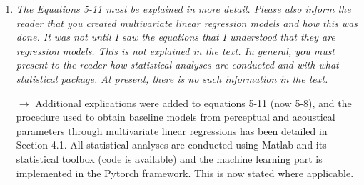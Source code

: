 \documentclass[10pt]{article}
\begin{document}
\begin{enumerate}
\item \emph{The Equations 5-11 must be explained in more detail. Please also inform the reader that you created multivariate linear regression models and how this was done. It was not until I saw the equations that I understood that they are regression models. This is not explained in the text. In general, you must present to the reader how statistical analyses are conducted and with what statistical package. At present, there is no such information in the text.}

$\rightarrow$ Additional explications were added to equations 5-11 (now 5-8), and the procedure used to obtain baseline models from perceptual and acoustical parameters through multivariate linear regressions has been detailed in Section 4.1. All statistical analyses are conducted using Matlab and its statistical toolbox (code is available) and the machine learning part is implemented in the Pytorch framework. This is now stated where applicable.

\end{enumerate}



\end{document}
